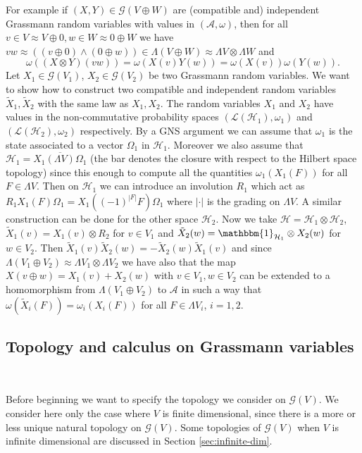 \documentclass{article}
\begin{document}
For example if $(X, Y) \in \mathcal{G} (V \oplus W)$ are (compatible and)
independent Grassmann random variables with values in $(\mathcal{A}, \omega)$,
then for all $v \in V \approx V \oplus 0, w \in W \approx 0 \oplus W$ we have
$v w \approx ((v \oplus 0) \wedge (0 \oplus w)) \in \Lambda (V \oplus W)
\approx \Lambda V \otimes \Lambda W$ and
\[ \omega ((X \otimes Y) (v w)) = \omega (X (v) Y (w)) = \omega (X (v)) \omega
   (Y (w)) . \]
Let $X_1 \in \mathcal{G} (V_1)$, $X_2 \in \mathcal{G} (V_2)$ be two Grassmann
random variables. We want to show how to construct two compatible and
independent random variables $\tilde{X}_1, \tilde{X}_2$ with the same law as
$X_1, X_2$. The random variables $X_1$ and $X_2 $ have values in the
non-commutative probability spaces $(\mathcal{L} (\mathcal{H}_1), \omega_1)$
and $(\mathcal{L} (\mathcal{H}_2), \omega_2)$ respectively. By a GNS argument
we can assume that $\omega_1$ is the state associated to a vector $\Omega_1$
in $\mathcal{H}_1$. Moreover we also assume that $\mathcal{H}_1 =
\overline{X_1 (\Lambda V) \Omega_1}$ (the bar denotes the closure with respect
to the Hilbert space topology) since this enough to compute all the quantities
$\omega_1 (X_1 (F))$ for all $F \in \Lambda V$. Then on $\mathcal{H}_1$ we can
introduce an involution $R_1$ which act as $R_1 X_1 (F) \Omega_1 = X_1 ((-
1)^{| F |} F) \Omega_1$ where $| \cdot |$ is the grading on $\Lambda V$. A
similar construction can be done for the other space $\mathcal{H}_2$. Now we
take $\mathcal{H}=\mathcal{H}_1 \otimes \mathcal{H}_2$, $\tilde{X}_1 (v) = X_1
(v) \otimes R_2$ for $v \in V_1$ and $\tilde{X}_2 (w)
=\mathbbm{1}_{\mathcal{H}_1} \otimes X_2 (w)$ for $w \in V_2$. Then
$\tilde{X}_1 (v) \tilde{X}_2 (w) = - \tilde{X}_2 (w) \tilde{X}_1 (v)$ and
since $\Lambda (V_1 \oplus V_2) \approx \Lambda V_1 \otimes \Lambda V_2$ we
have also that the map $X (v \oplus w) = X_1 (v) + X_2 (w)$ with $v \in V_1, w
\in V_2$ can be extended to a homomorphism from $\Lambda (V_1 \oplus V_2)$ to
$\mathcal{A}$ in such a way that $\omega (\tilde{X}_i (F)) = \omega_i (X_i
(F))$ for all $F \in \Lambda V_i$, $i = 1, 2$.

\subsection{Topology and calculus on Grassmann variables}

\

Before beginning we want to specify the topology we consider on $\mathcal{G}
(V)$. We consider here only the case where $V$ is finite dimensional, since
there is a more or less unique natural topology on $\mathcal{G} (V)$. Some
topologies of $\mathcal{G} (V)$ when $V$ is infinite dimensional are discussed
in Section \ref{sec:infinite-dim}.
\end{document}
